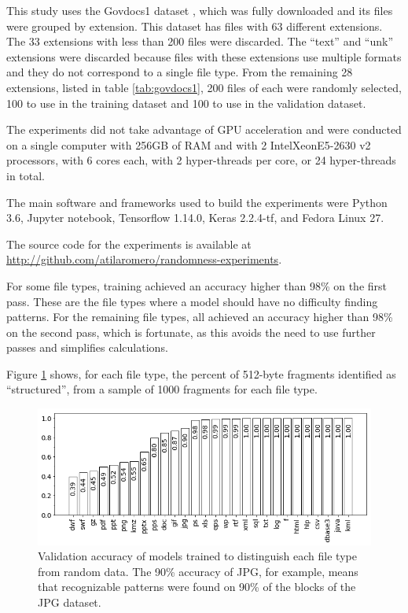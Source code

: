 This study uses the Govdocs1 dataset \cite{garfinkel_bringing_2009}, which was fully downloaded and its files were grouped by extension. This dataset has files with 63 different extensions. The 33 extensions with less than 200 files were discarded. The  ``text'' and ``unk'' extensions were discarded because files with these extensions use multiple formats and they do not correspond to a single file type. From the remaining 28 extensions, listed in table \ref{tab:govdocs1}, 200 files of each were randomly selected, 100 to use in the training dataset and 100 to use in the validation dataset.

The experiments did not take advantage of GPU acceleration and were  conducted on a single computer with 256GB of RAM and with 2 Intel\textregistered Xeon\textregistered E5-2630 v2 processors, with 6 cores each, with 2 hyper-threads per core, or 24 hyper-threads in total. 


The main software and frameworks used to build the experiments were Python 3.6, Jupyter notebook, Tensorflow 1.14.0, Keras 2.2.4-tf, and Fedora Linux 27.

The source code for the experiments is available at \sloppy\url{http://github.com/atilaromero/randomness-experiments}.


For some file types, training achieved an accuracy higher than 98\% on the first pass. These are the file types where a model should have no difficulty finding patterns. For the remaining file types, all achieved an accuracy higher than 98\% on the second pass, which is fortunate, as this avoids the need to use further passes and  simplifies calculations.

Figure \ref{fig:not_random} shows, for each file type, the percent of 512-byte fragments identified as ``structured'', from a sample of 1000 fragments for each file type.

\noindent
\begin{figure}[htb!]
\centering\includegraphics[width=1.0\textwidth]{content/random.png}
\caption{\label{fig:not_random}Validation accuracy of models trained to distinguish each file type from random data. The 90\% accuracy of JPG, for example, means that recognizable patterns were found on 90\% of the blocks of the JPG dataset.}%
\end{figure}

